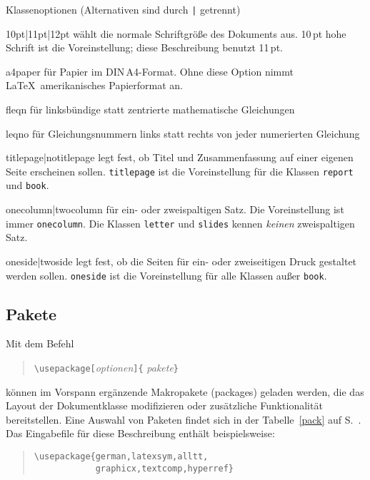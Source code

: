 \begin{table}[hbpt]
\caption[Klassenoptionen]{Klassenoptionen (Alternativen sind durch \texttt{|}
  getrennt)} \label{options}
\oben{11cm}
\begin{ttdescription}%
\item [10pt|11pt|12pt] wählt die normale Schriftgröße des Dokuments aus.
  10\,pt hohe Schrift ist die Voreinstellung; diese Beschreibung benutzt 11\,pt.

\item[a4paper] für Papier im DIN\,A4-Format. Ohne diese
  Option nimmt \LaTeX\ amerikanisches Papierformat an.
 
\item [fleqn] für linksbündige statt zentrierte mathematische
  Gleichungen
 
\item [leqno] für Gleichungsnummern links statt rechts von jeder
  numerierten Gleichung
 
\item [titlepage|notitlepage] legt fest, ob Titel und Zusammenfassung
  auf einer eigenen Seite erscheinen sollen.  \texttt{titlepage} ist
  die Voreinstellung für die Klassen \texttt{report} und \texttt{book}.
 
\item [onecolumn|twocolumn] für ein- oder zweispaltigen Satz.
 Die Voreinstellung ist immer \texttt{onecolumn}.  
 Die Klassen \texttt{letter} und \texttt{slides} kennen \emph{keinen}
 zweispaltigen Satz.
 
\item [oneside|twoside] legt fest, ob die Seiten für ein- oder
  zweiseitigen  Druck gestaltet werden sollen.  
  \texttt{oneside} ist die Voreinstellung für
  alle Klassen außer \texttt{book}.
  
\end{ttdescription}
\unten
\end{table}



\subsection{Pakete}\label{packages}
 
Mit dem Befehl
\begin{verse}
\verb:\usepackage[:\textit{optionen}\verb:]{:%
  \textit{pakete}\verb:}:
\end{verse}
können im Vorspann ergänzende Makropakete (packages) geladen werden,
die das Layout der Dokumentklasse
modifizieren oder zusätzliche Funktionalität bereitstellen.
Eine Auswahl von Paketen findet sich in der Tabelle~\ref{pack} 
auf S.~\pageref{pack}.
Das Eingabefile für diese Beschreibung enthält beispielsweise:
\begin{verse}
\verb|\usepackage{german,latexsym,alltt,|\\
\verb|            graphicx,textcomp,hyperref}|
\end{verse}


